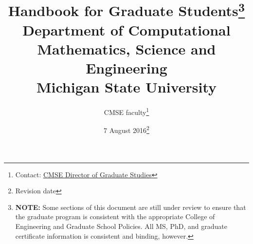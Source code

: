 \documentclass[12pt]{article}
\begin{document}
\vspace{-50mm}
\title{Handbook for Graduate Students\footnote{\textbf{NOTE:} Some
    sections of this document are still under review to ensure that
    the graduate program is consistent with the appropriate College of
  Engineering and Graduate School Policies.  All MS, PhD, and graduate
certificate information is consistent and binding, however.}\\
\vspace{20mm}
  \large Department of Computational Mathematics, Science and
  Engineering\\
\vspace{20mm}
Michigan State University
\vspace{50mm}
}

\author{CMSE faculty\footnote{Contact:
    \href{mailto:cmsegrad@msu.edu}{CMSE Director of Graduate Studies}
  }}

\date{7 August 2016\footnote{Revision date}}

\maketitle

\newpage

\tableofcontents

\newpage



\newpage



\newpage



\newpage



\newpage



\newpage



\newpage



\newpage



\newpage



\newpage



\newpage



\newpage


\end{document}
